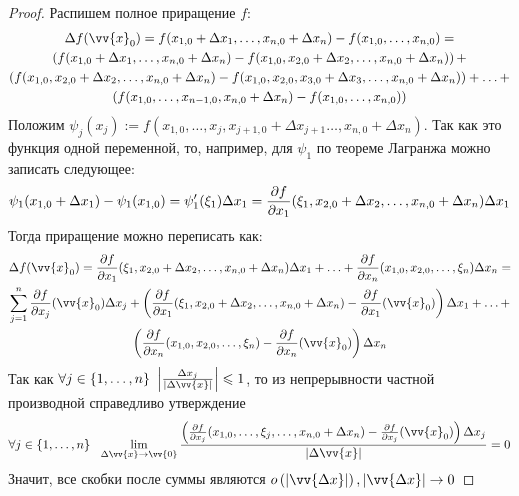 \begin{proof}
	Распишем полное приращение $f$:
	\begin{multline*}
		\Delta f(\vv{x}_0) = f(x_{1, 0} + \Delta x_1, \ldots, x_{n, 0} + \Delta x_n) - f(x_{1, 0}, \ldots, x_{n, 0}) =
		\\
		\left(f(x_{1, 0} + \Delta x_1, \ldots, x_{n, 0} + \Delta x_n) - f(x_{1, 0}, x_{2, 0} + \Delta x_2, \ldots, x_{n, 0} + \Delta x_n)\right) +
		\\
		\left(f(x_{1, 0}, x_{2, 0} + \Delta x_2, \ldots, x_{n, 0} + \Delta x_n) - f(x_{1, 0}, x_{2, 0}, x_{3, 0} + \Delta x_3, \ldots, x_{n, 0} + \Delta x_n)\right) + \ldots +
		\\
		\left(f(x_{1, 0}, \ldots, x_{n - 1, 0}, x_{n, 0} + \Delta x_n) - f(x_{1, 0}, \ldots, x_{n, 0})\right)
	\end{multline*}
	Положим $\psi_j(x_j) := f(x_{1, 0}, \ldots, x_j, x_{j+1, 0} + \Delta x_{j+1} \ldots, x_{n, 0} + \Delta x_n)$. Так как это функция одной переменной, то, например, для $\psi_1$ по теореме Лагранжа можно записать следующее:
	\[
		\psi_1(x_{1, 0} + \Delta x_1) - \psi_1(x_{1, 0}) = \psi'_1(\xi_1)\Delta x_1 = \frac{\partial f}{\partial x_1}(\xi_1, x_{2, 0} + \Delta x_2, \ldots, x_{n, 0} + \Delta x_n)\Delta x_1
	\]
	Тогда приращение можно переписать как:
	\begin{multline*}
		\Delta f(\vv{x}_0) = \pd{f}{x_1}(\xi_1, x_{2, 0} + \Delta x_2, \ldots, x_{n, 0} + \Delta x_n)\Delta x_1 + \ldots + \pd{f}{x_n}(x_{1, 0}, x_{2, 0}, \ldots, \xi_n)\Delta x_n =
		\\
		\suml_{j = 1}^n \pd{f}{x_j} (\vv{x}_0) \Delta x_j + \left(\pd{f}{x_1} (\xi_1, x_{2, 0} + \Delta x_2, \ldots, x_{n, 0} + \Delta x_n) - \pd{f}{x_1}(\vv{x}_0)\right)\Delta x_1 + \ldots +
		\\
		\left(\pd{f}{x_n} (x_{1, 0}, x_{2, 0}, \ldots, \xi_n) - \pd{f}{x_n} (\vv{x}_0)\right)\Delta x_n
	\end{multline*}
	Так как $\forall j \in \range{n}\ \left|\frac{\Delta x_j}{|\Delta \vv{x}|}\right| \leq 1$, то из непрерывности частной производной справедливо утверждение
	\[
		\forall j \in \range{n}\ \ \liml_{\Delta\vv{x} \to \vv{0}}\frac{\left(\frac{\vdelta f}{\vdelta x_j}(x_{1, 0}, \ldots, \xi_j, \ldots, x_{n, 0} + \Delta x_n) - \frac{\vdelta f}{\vdelta x_j}(\vv{x}_0)\right) \Delta x_j}{|\Delta \vv{x}|} = 0
	\]
	Значит, все скобки после суммы являются $o\left(|\vv{\Delta x}|\right), |\vv{\Delta x}| \to 0$
\end{proof}
